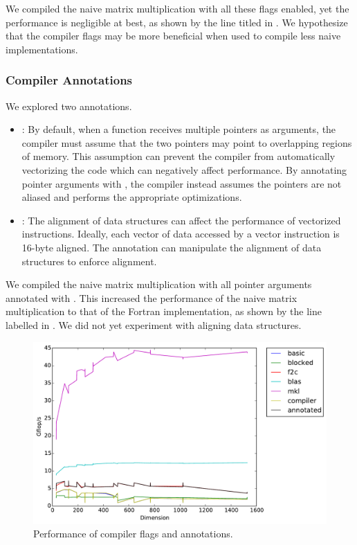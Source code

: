 We compiled the naive matrix multiplication with all these \icc{} flags
enabled, yet the performance is negligible at best, as shown by the line titled
 in . We hypothesize that the compiler flags may
be more beneficial when used to compile less naive implementations.

\subsubsection{Compiler Annotations}
We explored two \icc{} annotations.
\begin{itemize}
  \item {}:
    By default, when a function receives multiple pointers as arguments, the
    compiler must assume that the two pointers may point to overlapping regions
    of memory. This assumption can prevent the compiler from automatically
    vectorizing the code which can negatively affect performance. By annotating
    pointer arguments with , the compiler instead assumes the
    pointers are not aliased and performs the appropriate optimizations.

  \item {}:
    The alignment of data structures can affect the performance of vectorized
    instructions. Ideally, each vector of data accessed by a vector instruction
    is 16-byte aligned. The  annotation can manipulate the
    alignment of data structures to enforce alignment.
\end{itemize}

We compiled the naive matrix multiplication with all pointer arguments
annotated with . This increased the performance of the naive
matrix multiplication to that of the Fortran implementation, as shown by the
line labelled  in . We did not yet experiment
with aligning data structures.

\begin{figure}[h]
  \centering
  \includegraphics[width=\textwidth]{timing_compiler.pdf}
  \caption{Performance of compiler flags and annotations.}
  \label{fig:compiler}
\end{figure}
